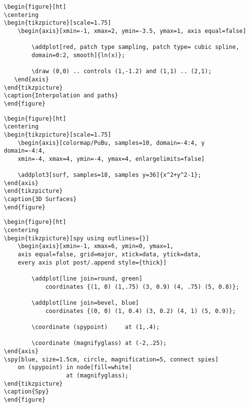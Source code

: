 




\newpage
\begin{verbatim}
\begin{figure}[ht]
\centering
\begin{tikzpicture}[scale=1.75]
    \begin{axis}[xmin=-1, xmax=2, ymin=-3.5, ymax=1, axis equal=false]

        \addplot[red, patch type sampling, patch type= cubic spline,
        domain=0:2, smooth]{ln(x)};
        
        \draw (0,0) .. controls (1,-1.2) and (1,1) .. (2,1);
   \end{axis}
\end{tikzpicture}
\caption{Interpolation and paths}
\end{figure}
\end{verbatim}





\newpage
\begin{verbatim}
\begin{figure}[ht]
\centering
\begin{tikzpicture}[scale=1.75]
    \begin{axis}[colormap/PuBu, samples=10, domain=-4:4, y domain=-4:4,
    xmin=-4, xmax=4, ymin=-4, ymax=4, enlargelimits=false]
    
    \addplot3[surf, samples=18, samples y=36]{x^2+y^2-1};
\end{axis}
\end{tikzpicture}	
\caption{3D Surfaces}
\end{figure}
\end{verbatim}





\newpage
\begin{verbatim}
\begin{figure}[ht]
\centering
\begin{tikzpicture}[spy using outlines={}]
    \begin{axis}[xmin=-1, xmax=6, ymin=0, ymax=1,
    axis equal=false, grid=major, xtick=data, ytick=data,
    every axis plot post/.append style={thick}]

        \addplot[line join=round, green]
            coordinates {(1, 0) (1,.75) (3, 0.9) (4, .75) (5, 0.8)};
            
        \addplot[line join=bevel, blue]
            coordinates {(0, 0) (1, 0.4) (3, 0.2) (4, 1) (5, 0.9)};

        \coordinate (spypoint)     at (1,.4);
        
        \coordinate (magnifyglass) at (-2,.25);
\end{axis}
\spy[blue, size=1.5cm, circle, magnification=5, connect spies]
    on (spypoint) in node[fill=white]
                  at (magnifyglass);
\end{tikzpicture}	
\caption{Spy}
\end{figure}
\end{verbatim}

